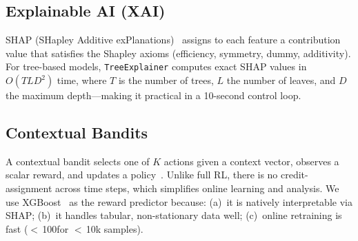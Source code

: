 \subsection{Explainable AI (XAI)}
SHAP (SHapley Additive exPlanations)~\cite{lundberg2017shap} assigns to
each feature a contribution value that satisfies the Shapley axioms
(efficiency, symmetry, dummy, additivity).
For tree-based models, \texttt{TreeExplainer} computes exact SHAP values
in $O(TLD^2)$ time, where $T$ is the number of trees, $L$ the number of
leaves, and $D$ the maximum depth---making it practical in a 10-second
control loop.

\subsection{Contextual Bandits}
A contextual bandit selects one of $K$ actions given a context vector,
observes a scalar reward, and updates a policy~\cite{sutton2018rl}.
Unlike full RL, there is no credit-assignment across time steps, which
simplifies online learning and analysis.
We use XGBoost~\cite{chen2016xgboost} as the reward predictor because:
(a)~it is natively interpretable via SHAP;
(b)~it handles tabular, non-stationary data well;
(c)~online retraining is fast ($<$\,100\ms for $<$\,10k samples).
